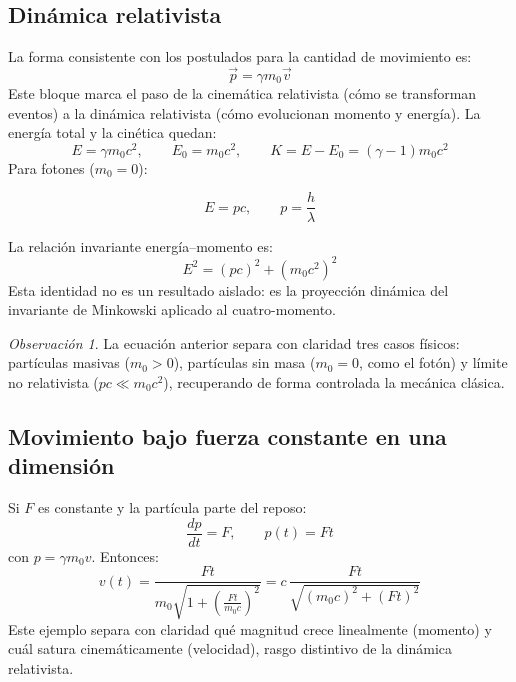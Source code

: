 \documentclass[12pt, a4paper]{article}
\theoremstyle{plain}
\theoremstyle{definition}
\theoremstyle{remark}
\newtheorem*{observacion}{Observación}
\newcommand{\ve}[1]{\vec{#1}}
\begin{document}
\subsection{Dinámica relativista}

La forma consistente con los postulados para la cantidad de movimiento es:
\begin{equation}
  \ve{p}=\gamma m_0\ve{v}
\end{equation}
Este bloque marca el paso de la cinemática relativista (cómo se transforman eventos) a la
dinámica relativista (cómo evolucionan momento y energía).
La energía total y la cinética quedan:
\begin{equation}
  E=\gamma m_0 c^2,\qquad E_0=m_0c^2,\qquad K=E-E_0=(\gamma-1)m_0c^2
\end{equation}
Para fotones ($m_0=0$):
\begin{mdframed}[style=resultado]
\begin{equation}
  E=pc,\qquad p=\frac{h}{\lambda}
\end{equation}
\end{mdframed}

La relación invariante energía--momento es:
\begin{equation}
  E^2=(pc)^2+(m_0c^2)^2
\end{equation}
Esta identidad no es un resultado aislado: es la proyección dinámica del invariante de
Minkowski aplicado al cuatro-momento.
\begin{observacion}
La ecuación anterior separa con claridad tres casos físicos: partículas masivas
($m_0>0$), partículas sin masa ($m_0=0$, como el fotón) y límite no relativista
($pc\ll m_0c^2$), recuperando de forma controlada la mecánica clásica.
\end{observacion}
\subsection{Movimiento bajo fuerza constante en una dimensión}

Si $F$ es constante y la partícula parte del reposo:
\begin{equation}
  \frac{dp}{dt}=F,\qquad p(t)=Ft
\end{equation}
con $p=\gamma m_0 v$. Entonces:
\begin{equation}
  v(t)=\frac{Ft}{m_0\sqrt{1+\left(\frac{Ft}{m_0c}\right)^2}}
      = c\,\frac{Ft}{\sqrt{(m_0c)^2+(Ft)^2}}
\end{equation}
Este ejemplo separa con claridad qué magnitud crece linealmente (momento) y cuál satura
cinemáticamente (velocidad), rasgo distintivo de la dinámica relativista.
\end{document}
